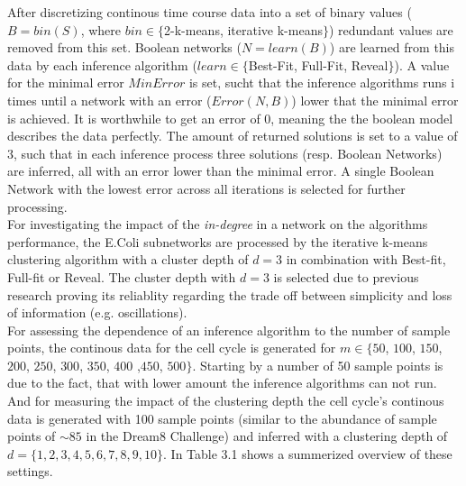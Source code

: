After discretizing continous time course data into a set of binary values ($B=bin(S)$, where $bin\in \{ $2-k-means, iterative k-means$\}$) redundant values are removed from this set. Boolean networks ($N=learn(B)$) are learned from this data by each inference algorithm ($learn\in \{$Best-Fit, Full-Fit, Reveal$\}$). A value for the minimal error $MinError$ is set, sucht that the inference algorithms runs i times until a network with an error ($Error(N,B)$) lower that the minimal error is achieved. It is worthwhile to get an error of $0$, meaning the the boolean model describes the data perfectly. The amount of returned solutions is set to a value of $3$, such that in each inference process three solutions (resp. Boolean Networks) are inferred, all with an error lower than the minimal error. A single Boolean Network with the lowest error across all iterations is selected for further processing.\\
For investigating the impact of the \textit{in-degree} in a network on the algorithms performance, the E.Coli subnetworks are processed by the iterative k-means clustering algorithm with a cluster depth of $d=3$ in combination with Best-fit, Full-fit or Reveal. The cluster depth with $d=3$ is selected due to previous research proving its reliablity regarding the trade off between simplicity and loss of information (e.g. oscillations).\\
For assessing the dependence of an inference algorithm to the number of sample points, the continous data for the cell cycle is generated for $m\in\{ 50$, $100$, $150$, $200$, $250$, $300$, $350$, $400$ ,$450$, $500\}$. Starting by a number of 50 sample points is due to the fact, that with lower amount the inference algorithms can not run. And for measuring the impact of the clustering depth the cell cycle's continous data is generated with 100 sample points (similar to the abundance of sample points of $\sim 85$ in the Dream8 Challenge) and inferred with a clustering depth of $d=\{ 1,2,3,4,5,6,7,8,9,10\}$. In Table 3.1 shows a summerized overview of these settings.

